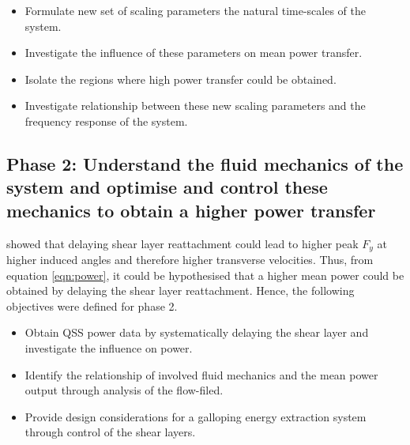  \begin{itemize}
\item Formulate new set of scaling parameters the natural time-scales of the system.
\item Investigate the influence of these parameters on mean power transfer.
\item Isolate the regions where high power transfer could be obtained.
\item Investigate relationship between these new scaling parameters and the frequency response of the system. 
 \end{itemize}
 
    
  \subsection*{Phase 2: Understand the fluid mechanics of the system and optimise and control these mechanics to obtain a higher power transfer}
  
  \citet{Luo1994} showed that delaying shear layer reattachment could lead to higher peak $F_{y}$ at higher induced angles and therefore higher transverse velocities. Thus, from equation \ref{eqn:power}, it could be hypothesised that a higher mean power could be obtained by delaying the shear layer reattachment. Hence, the following objectives were defined for phase 2. 
  
  \begin{itemize}
  	\item Obtain QSS power data by systematically delaying the shear layer and investigate the influence on power.
  	\item Identify the relationship of involved fluid mechanics and the mean power output through analysis of the flow-filed.
  	\item Provide design considerations for a galloping energy extraction system through control of the shear layers. 
  \end{itemize}
 
 
 
 
 
 
 























  


    

     











